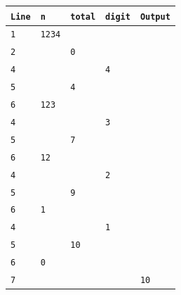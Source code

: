 \begin{tabular}{l l l l l}
\toprule
\texttt{Line} & \texttt{n} & \texttt{total} & \texttt{digit} & \texttt{Output} \\
\midrule
\texttt{1} & \texttt{1234} &  &  &  \\
\texttt{2} &  & \texttt{0} &  &  \\
\texttt{4} &  &  & \texttt{4} &  \\
\texttt{5} &  & \texttt{4} &  &  \\
\texttt{6} & \texttt{123} &  &  &  \\
\texttt{4} &  &  & \texttt{3} &  \\
\texttt{5} &  & \texttt{7} &  &  \\
\texttt{6} & \texttt{12} &  &  &  \\
\texttt{4} &  &  & \texttt{2} &  \\
\texttt{5} &  & \texttt{9} &  &  \\
\texttt{6} & \texttt{1} &  &  &  \\
\texttt{4} &  &  & \texttt{1} &  \\
\texttt{5} &  & \texttt{10} &  &  \\
\texttt{6} & \texttt{0} &  &  &  \\
\texttt{7} &  &  &  & \texttt{10} \\
\bottomrule
\end{tabular}
